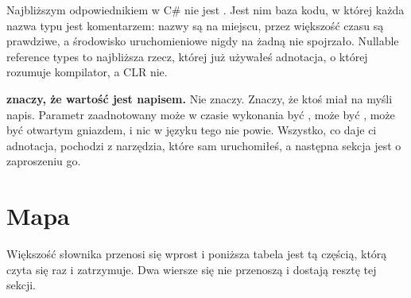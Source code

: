 \begin{csbox}
Najbliższym odpowiednikiem w C\# nie jest . Jest nim baza
kodu, w której każda nazwa typu jest komentarzem: nazwy są na miejscu, przez
większość czasu są prawdziwe, a środowisko uruchomieniowe nigdy na żadną nie
spojrzało. Nullable reference types to najbliższa rzecz, której już
używałeś \dash{} adnotacja, o której rozumuje kompilator, a CLR nie.
\end{csbox}

\begin{trapbox}
\textbf{ znaczy, że wartość jest napisem.} Nie znaczy. Znaczy, że
ktoś miał na myśli napis. Parametr zaadnotowany  może w czasie
wykonania być , może być , może być otwartym gniazdem, i
nic w języku tego nie powie. Wszystko, co daje ci adnotacja, pochodzi z
narzędzia, które sam uruchomiłeś, a następna sekcja jest o zaproszeniu go.
\end{trapbox}


\section{Mapa}
\label{sec:ch03-map}

Większość słownika przenosi się wprost i poniższa tabela jest tą częścią,
którą czyta się raz i zatrzymuje. Dwa wiersze się nie przenoszą i dostają
resztę tej sekcji.

